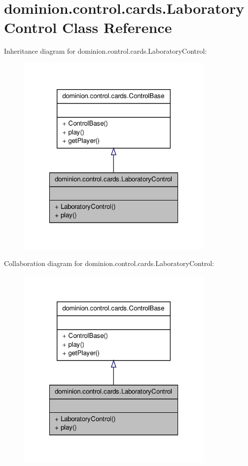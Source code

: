 \hypertarget{classdominion_1_1control_1_1cards_1_1LaboratoryControl}{\section{dominion.\-control.\-cards.\-Laboratory\-Control \-Class \-Reference}
\label{classdominion_1_1control_1_1cards_1_1LaboratoryControl}
}


\-Inheritance diagram for dominion.\-control.\-cards.\-Laboratory\-Control\-:
\nopagebreak
\begin{figure}[H]
\begin{center}
\leavevmode
\includegraphics[width=274pt]{classdominion_1_1control_1_1cards_1_1LaboratoryControl__inherit__graph}
\end{center}
\end{figure}


\-Collaboration diagram for dominion.\-control.\-cards.\-Laboratory\-Control\-:
\nopagebreak
\begin{figure}[H]
\begin{center}
\leavevmode
\includegraphics[width=274pt]{classdominion_1_1control_1_1cards_1_1LaboratoryControl__coll__graph}
\end{center}
\end{figure}
